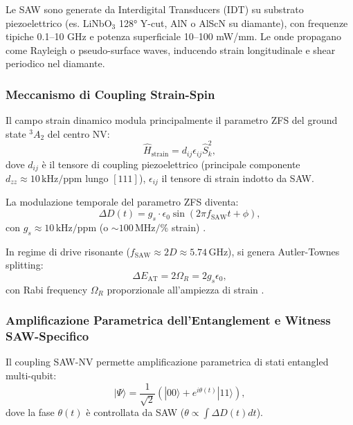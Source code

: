 \documentclass[12pt,a4paper]{article}
\begin{document}
Le SAW sono generate da Interdigital Transducers (IDT) su substrato piezoelettrico (es. LiNbO$_3$ 128° Y-cut, AlN o AlScN su diamante), con frequenze tipiche 0.1--10 GHz e potenza superficiale 10--100 mW/mm. Le onde propagano come Rayleigh o pseudo-surface waves, inducendo strain longitudinale e shear periodico nel diamante.

\subsubsection{Meccanismo di Coupling Strain-Spin}

Il campo strain dinamico modula principalmente il parametro ZFS del ground state $^3A_2$ del centro NV:
\begin{equation}
\hat{H}_{\mathrm{strain}} = d_{ij} \epsilon_{ij} \hat{S}_k^2,
\label{eq:strain_hamiltonian}
\end{equation}
dove $d_{ij}$ è il tensore di coupling piezoelettrico (principale componente $d_{zz} \approx 10\,\mathrm{kHz}/\mathrm{ppm}$ lungo $[111]$), $\epsilon_{ij}$ il tensore di strain indotto da SAW.

La modulazione temporale del parametro ZFS diventa:
\begin{equation}
\Delta D(t) = g_s \cdot \epsilon_0 \sin(2\pi f_{\mathrm{SAW}} t + \phi),
\label{eq:ZFS_modulation}
\end{equation}
con $g_s \approx 10\,\mathrm{kHz}/\mathrm{ppm}$ (o $\sim 100\,\mathrm{MHz}/\%$ strain) \cite{Barson2018, Teissier2020, Sangtawesuk2021}.

In regime di drive risonante ($f_{\mathrm{SAW}} \approx 2D \approx 5.74\,\mathrm{GHz}$), si genera Autler-Townes splitting:
\begin{equation}
\Delta E_{\mathrm{AT}} = 2 \Omega_R = 2 g_s \epsilon_0,
\label{eq:Autler_Townes}
\end{equation}
con Rabi frequency $\Omega_R$ proporzionale all'ampiezza di strain \cite{Jeske2016, Golter2016}.

\subsubsection{Amplificazione Parametrica dell'Entanglement e Witness SAW-Specifico}

Il coupling SAW-NV permette amplificazione parametrica di stati entangled multi-qubit:
\begin{equation}
|\Psi\rangle = \frac{1}{\sqrt{2}} \left( |00\rangle + e^{i\theta(t)} |11\rangle \right),
\label{eq:parametric_entanglement}
\end{equation}
dove la fase $\theta(t)$ è controllata da SAW ($\theta \propto \int \Delta D(t) dt$).
\end{document}
